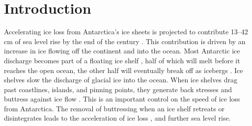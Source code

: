 \section{Introduction} \label{sec:data_intro}



Accelerating ice loss from Antarctica's ice sheets is projected to contribute 13--42 cm of sea level rise by the end of the century \citep{edwards2021projected}.
This contribution is driven by an increase in ice flowing off the continent and into the ocean. Most Antarctic ice discharge becomes part of a floating ice shelf \citep{rignot2013ice}, half of which will melt before it reaches the open ocean, the other half will eventually break off as icebergs \citep{rignot2013ice,liu2015ocean}. 
Ice shelves slow the discharge of glacial ice into the ocean. When ice shelves drag past coastlines, islands, and pinning points, they generate back stresses and buttress against ice flow \cite [e.g.][] {dupont2005assessment, furst2016safety}.  This is an important control on the speed of ice loss from Antarctica.  The removal of buttressing when an ice shelf retreats or disintegrates leads to the acceleration of ice loss \citep{rignot2004accelerated, berthier2012mass}, and further sea level rise.


